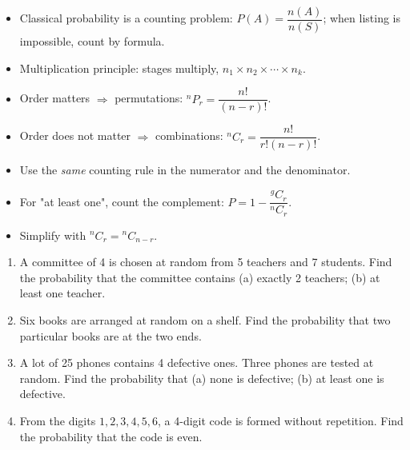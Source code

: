 \documentclass[11pt]{article}
\begin{document}
\begin{aretenir}
\begin{itemize}
\item Classical probability is a counting problem: $P(A) = \dfrac{n(A)}{n(S)}$; when listing is impossible, count by formula.
\item Multiplication principle: stages multiply, $n_1 \times n_2 \times \cdots \times n_k$.
\item Order matters $\Rightarrow$ permutations: ${}^{n}P_{r} = \dfrac{n!}{(n-r)!}$.
\item Order does not matter $\Rightarrow$ combinations: ${}^{n}C_{r} = \dfrac{n!}{r!(n-r)!}$.
\item Use the \emph{same} counting rule in the numerator and the denominator.
\item For "at least one", count the complement: $P = 1 - \dfrac{{}^{g}C_{r}}{{}^{n}C_{r}}$.
\item Simplify with ${}^{n}C_{r} = {}^{n}C_{n-r}$.
\end{itemize}
\end{aretenir}

\begin{exercice}[Practice]
\begin{enumerate}
\item A committee of 4 is chosen at random from 5 teachers and 7 students. Find the probability that the committee contains (a) exactly 2 teachers; (b) at least one teacher.
\item Six books are arranged at random on a shelf. Find the probability that two particular books are at the two ends.
\item A lot of 25 phones contains 4 defective ones. Three phones are tested at random. Find the probability that (a) none is defective; (b) at least one is defective.
\item From the digits $1,2,3,4,5,6$, a 4-digit code is formed without repetition. Find the probability that the code is even.
\end{enumerate}
\end{exercice}
\end{document}
